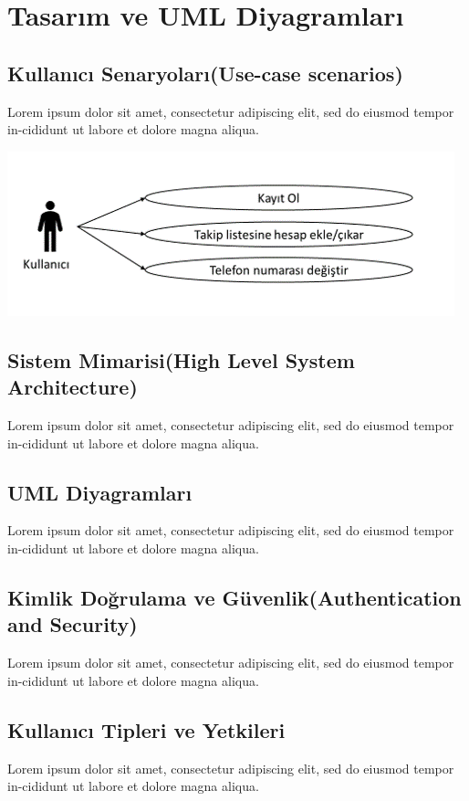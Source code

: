 \section{Tasarım ve UML Diyagramları}


\subsection{Kullanıcı Senaryoları(Use-case scenarios)}
Lorem  ipsum  dolor  sit  amet,  consectetur  adipiscing  elit,  sed  do  eiusmod  tempor  in-cididunt  ut  labore  et  dolore  magna  aliqua. 
\begin{center}
\thispagestyle{empty}
\includegraphics{Report/images/use-case-1.png}\\
\vspace{\fill}
\end{center}
\subsection{Sistem Mimarisi(High Level System Architecture)}
Lorem  ipsum  dolor  sit  amet,  consectetur  adipiscing  elit,  sed  do  eiusmod  tempor  in-cididunt  ut  labore  et  dolore  magna  aliqua. 
\subsection{UML Diyagramları}
Lorem  ipsum  dolor  sit  amet,  consectetur  adipiscing  elit,  sed  do  eiusmod  tempor  in-cididunt  ut  labore  et  dolore  magna  aliqua. 
\subsection{Kimlik Doğrulama ve Güvenlik(Authentication and Security)}
Lorem  ipsum  dolor  sit  amet,  consectetur  adipiscing  elit,  sed  do  eiusmod  tempor  in-cididunt  ut  labore  et  dolore  magna  aliqua. 
\subsection{Kullanıcı Tipleri ve Yetkileri}
Lorem  ipsum  dolor  sit  amet,  consectetur  adipiscing  elit,  sed  do  eiusmod  tempor  in-cididunt  ut  labore  et  dolore  magna  aliqua. 
